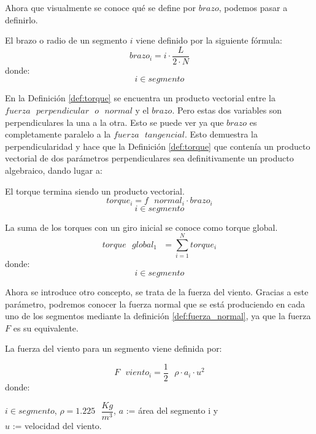 Ahora que visualmente se conoce qué se define por $brazo$, podemos pasar a definirlo.

\begin{definicion}
El  brazo o radio de un segmento $i$ viene definido por la siguiente fórmula:
$$ brazo_i  =  i \cdot \dfrac{L}{2 \cdot N}$$
    donde:
 $$ i \in segmento$$

\end{definicion}

 
 En la Definición \ref{def:torque} se encuentra un producto vectorial entre la $fuerza  \text{ }perpendicular \text{ } o \text{ } normal$ y el $brazo$. Pero estas dos variables son perpendiculares la una a la otra. Esto se puede ver ya que $brazo$ es completamente paralelo a la $fuerza \text{ } tangencial$. Esto demuestra la perpendicularidad y hace que la Definición \ref{def:torque} que contenía un producto vectorial de dos parámetros perpendiculares sea definitivamente un producto algebraico, dando lugar a:
 
  \begin{definicion}
  El torque termina siendo un producto vectorial.
 $$ torque_i = f \text{ } normal_i \cdot brazo_i$$
 $$ i \in segmento$$
 \label{def:torque_vectorial}
 \end{definicion}
 
\begin{definicion}
 La suma de los torques con un giro inicial se conoce como torque global.
 $$ torque \text{ } global_1 \text{ } = \sum_{i=1}^{N} torque_i $$
 donde:
 $$ i \in segmento$$
 \label{def:torque_global}
\end{definicion}


 Ahora se introduce otro concepto, se trata de la fuerza del viento. Gracias a este parámetro, podremos conocer la fuerza normal que se está produciendo en cada uno de los segmentos mediante la definición \ref{def:fuerza_normal}, ya que la fuerza $F$ es su equivalente.
 
 \begin{definicion}
 La fuerza del viento para un segmento viene definida por:
 
 $$ F \text{ } viento_i = \dfrac{1}{2} \text{ } \rho \cdot a_i \cdot u^2$$
 donde:
 
  \centering $i \in segmento$,  $\rho = 1.225 \text{ } \dfrac{Kg}{m^3}$, $a$ := área del segmento i y \\ $u$ := velocidad del viento.
 \label{def:fuerza_viento}
 \end{definicion}
 
